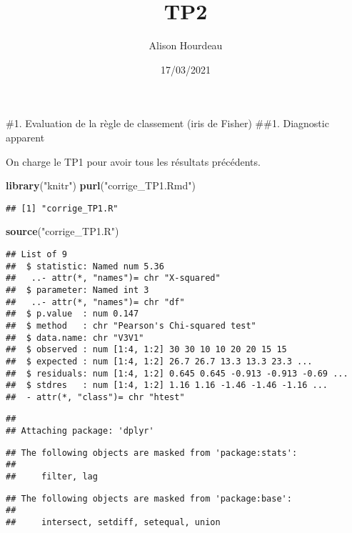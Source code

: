 \documentclass[
]{article}
\title{TP2}
\author{Alison Hourdeau}
\date{17/03/2021}
\newenvironment{Shaded}{\begin{snugshade}}{\end{snugshade}}
\newcommand{\KeywordTok}[1]{\textcolor[rgb]{0.13,0.29,0.53}{\textbf{#1}}}
\newcommand{\NormalTok}[1]{#1}
\newcommand{\StringTok}[1]{\textcolor[rgb]{0.31,0.60,0.02}{#1}}
\begin{document}
\maketitle

\#1. Evaluation de la règle de classement (iris de Fisher) \#\#1.
Diagnostic apparent

On charge le TP1 pour avoir tous les résultats précédents.

\begin{Shaded}
\begin{Highlighting}[]
\KeywordTok{library}\NormalTok{(}\StringTok{"knitr"}\NormalTok{)}
\KeywordTok{purl}\NormalTok{(}\StringTok{"corrige_TP1.Rmd"}\NormalTok{)}
\end{Highlighting}
\end{Shaded}

\begin{verbatim}
## [1] "corrige_TP1.R"
\end{verbatim}

\begin{Shaded}
\begin{Highlighting}[]
\KeywordTok{source}\NormalTok{(}\StringTok{"corrige_TP1.R"}\NormalTok{)}
\end{Highlighting}
\end{Shaded}

\begin{verbatim}
## List of 9
##  $ statistic: Named num 5.36
##   ..- attr(*, "names")= chr "X-squared"
##  $ parameter: Named int 3
##   ..- attr(*, "names")= chr "df"
##  $ p.value  : num 0.147
##  $ method   : chr "Pearson's Chi-squared test"
##  $ data.name: chr "V3V1"
##  $ observed : num [1:4, 1:2] 30 30 10 10 20 20 15 15
##  $ expected : num [1:4, 1:2] 26.7 26.7 13.3 13.3 23.3 ...
##  $ residuals: num [1:4, 1:2] 0.645 0.645 -0.913 -0.913 -0.69 ...
##  $ stdres   : num [1:4, 1:2] 1.16 1.16 -1.46 -1.46 -1.16 ...
##  - attr(*, "class")= chr "htest"
\end{verbatim}

\begin{verbatim}
## 
## Attaching package: 'dplyr'
\end{verbatim}

\begin{verbatim}
## The following objects are masked from 'package:stats':
## 
##     filter, lag
\end{verbatim}

\begin{verbatim}
## The following objects are masked from 'package:base':
## 
##     intersect, setdiff, setequal, union
\end{verbatim}
\end{document}
